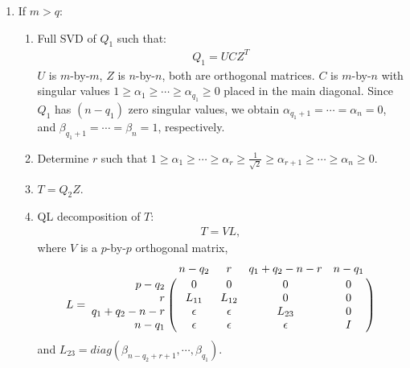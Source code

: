 \begin{enumerate}
        \item If $m > q$:
            \begin{enumerate}
                \item Full SVD of $Q_1$ such that:
                    \begin{align}
                        Q_1 = UCZ^{T}
                    \end{align}
                    $U$ is $m$-by-$m$, $Z$ is $n$-by-$n$, both are orthogonal matrices. $C$ is $m$-by-$n$ with singular values $1 \geq \alpha_1 \geq \cdots \geq \alpha_{q_1} \geq 0$ placed in the main diagonal. Since $Q_1$ has $(n-q_1)$ zero singular values, we obtain $\alpha_{q_1+1} = \cdots = \alpha_{n} = 0$, and $\beta_{q_1+1} = \cdots = \beta_{n} = 1$, respectively. 
                \item Determine $r$ such that $1 \geq \alpha_{1} \geq \cdots \geq \alpha_{r} \geq \frac{1}{\sqrt{2}} \geq \alpha_{r+1} \geq \cdots \geq \alpha_{n} \geq 0$. 
                \item $T = Q_2Z$.
                \item QL decomposition of $T$:
                    \begin{align}
                        T = VL,
                    \end{align}
                    where $V$ is a $p$-by-$p$ orthogonal matrix, 
                    \begin{displaymath}
                        L = \bordermatrix{ & n-q_2 & r & q_1+q_2-n-r & n-q_1 \cr
                                    \hfill p-q_2 & 0 & 0 & 0 & 0 \cr
                                    \hfill r & L_{11} & L_{12} & 0 & 0 \cr
                                    \hfill q_1+q_2-n-r & \epsilon & \epsilon & L_{23} & 0 \cr
                                    \hfill n-q_1 & \epsilon & \epsilon & \epsilon & I}
                    \end{displaymath}
                    and $L_{23} = diag(\beta_{n-q_2+r+1}, \cdots, \beta_{q_1})$.
                

\end{enumerate}
\end{enumerate}
